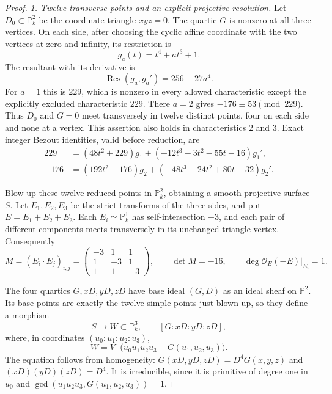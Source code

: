 \begin{proof}
\emph{1. Twelve transverse points and an explicit projective resolution.}
Let $D_0\subset\mathbb P^2_k$ be the coordinate triangle $xyz=0$.
The quartic $G$ is nonzero at all three vertices. On each side,
after choosing the cyclic affine coordinate with the two
vertices at zero and infinity, its restriction is
\[
                       g_a(t)=t^4+a t^3+1.
\]
The resultant with its derivative is
\[
                \operatorname{Res}(g_a,g_a')=256-27a^4.
\]
For $a=1$ this is $229$, which is nonzero in every allowed
characteristic except the explicitly excluded characteristic
$229$. There $a=2$ gives $-176\equiv53\pmod{229}$.
Thus $D_0$ and $G=0$ meet transversely in twelve distinct
points, four on each side and none at a vertex. This assertion
also holds in characteristics $2$ and $3$. Exact integer
Bezout identities, valid before reduction, are
\begin{align*}
 229&=(48t^2+229)g_1
       +(-12t^3-3t^2-55t-16)g_1',\\
 -176&=(192t^2-176)g_2
       +(-48t^3-24t^2+80t-32)g_2'.
\end{align*}

Blow up these twelve reduced points in $\mathbb P^2_k$, obtaining
a smooth projective surface $S$. Let $E_1,E_2,E_3$ be the strict
transforms of the three sides, and put $E=E_1+E_2+E_3$.
Each $E_i\simeq\mathbb P^1_k$ has self-intersection $-3$,
and each pair of different components meets transversely
in its unchanged triangle vertex. Consequently
\begin{equation}\label{eq:C3y-matrix}
 M=(E_i\cdot E_j)_{i,j}
 =\begin{pmatrix}-3&1&1\\1&-3&1\\1&1&-3\end{pmatrix},
 \qquad \det M=-16,
 \qquad \deg\mathcal O_E(-E)|_{E_i}=1.
\end{equation}

The four quartics $G,xD,yD,zD$ have base ideal $(G,D)$
as an ideal sheaf on $\mathbb P^2$. Its base points are
exactly the twelve simple points just blown up, so they
define a morphism
\[
 S\longrightarrow W\subset\mathbb P^3_k,
 \qquad [G:xD:yD:zD],
\]
where, in coordinates $(u_0:u_1:u_2:u_3)$,
\begin{equation}\label{eq:C3y-projective-image}
             W=V_+\bigl(u_0u_1u_2u_3-G(u_1,u_2,u_3)\bigr).
\end{equation}
The equation follows from homogeneity:
$G(xD,yD,zD)=D^4G(x,y,z)$ and
$(xD)(yD)(zD)=D^4$. It is irreducible, since it is
primitive of degree one in $u_0$ and
$\gcd(u_1u_2u_3,G(u_1,u_2,u_3))=1$.


\end{proof}
